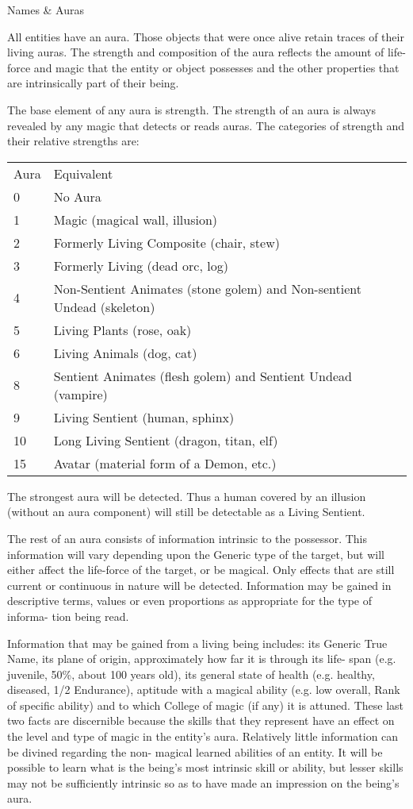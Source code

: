 \begin{Chapter}{Names \& Auras}

All entities have an aura.  Those objects that were once alive retain
traces of their living auras.  The strength and composition of the
aura reflects the amount of life-force and magic that the entity or
object possesses and the other properties that are intrinsically part
of their being.

The base element of any aura is strength.  The strength of an aura is
always revealed by any magic that detects or reads auras. The
categories of strength and their relative strengths are:

\begin{tabularx}{\columnwidth}{lX}
Aura	& Equivalent\\ 
0	& No Aura \\
1	& Magic (magical wall, illusion) \\
2	& Formerly Living Composite (chair, stew) \\
3	& Formerly Living (dead orc, log) \\
4	& Non-Sentient Animates (stone golem) and Non-sentient Undead (skeleton) \\
5	& Living Plants (rose, oak) \\
6	& Living Animals (dog, cat) \\
8	& Sentient Animates (flesh golem) and Sentient Undead (vampire) \\
9	& Living Sentient (human, sphinx) \\
10	& Long Living Sentient (dragon, titan, elf) \\
15	& Avatar (material form of a Demon, etc.) \\
\end{tabularx}

The strongest aura will be detected. Thus a human covered by an
illusion (without an aura component) will still be detectable as a
Living Sentient.

The rest of an aura consists of information intrinsic to the
possessor.  This information will vary depending upon the Generic type
of the target, but will either affect the life-force of the target, or
be magical.  Only effects that are still current or continuous in
nature will be detected. Information may be gained in descriptive
terms, values or even proportions as appropriate for the type of
informa- tion being read.

Information that may be gained from a living being includes: its
Generic True Name, its plane of origin, approximately how far it is
through its life- span (e.g.  juvenile, 50\%, about 100 years old),
its general state of health (e.g.  healthy, diseased, 1/2 Endurance),
aptitude with a magical ability (e.g.  low overall, Rank of specific
ability) and to which College of magic (if any) it is attuned.  These
last two facts are discernible because the skills that they represent
have an effect on the level and type of magic in the entity’s aura.
Relatively little information can be divined regarding the non-
magical learned abilities of an entity.  It will be possible to learn
what is the being’s most intrinsic skill or ability, but lesser skills
may not be sufficiently intrinsic so as to have made an impression on
the being’s aura.


\end{Chapter}
